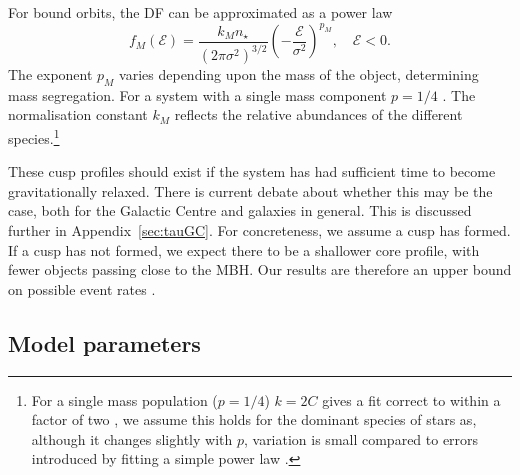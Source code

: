\documentclass[useAMS,usedcolumn,usegraphicx,usenatbib]{mn2e}
\newcommand{\apref}[1]{Appendix~\ref{sec:#1}}
\begin{document}
For bound orbits, the DF can be approximated as a power law \citep{Peebles1972}
\begin{equation}
f_M(\mathcal{E}) = \frac{k_M n_\star}{(2\pi\sigma^2)^{3/2}}\left(-\frac{\mathcal{E}}{\sigma^2}\right)^{p_M},\quad\mathcal{E} < 0.
\label{eq:Bound_DF}
\end{equation}
The exponent $p_M$ varies depending upon the mass of the object, determining mass segregation. For a system with a single mass component $p = 1/4$ \citep{Bahcall1976, Young1977}. The normalisation constant $k_M$ reflects the relative abundances of the different species.\footnote{For a single mass population ($p = 1/4$) $k = 2 C$ gives a fit correct to within a factor of two \citep{Bahcall1976,Keshet2009}, we assume this holds for the dominant species of stars as, although it changes slightly with $p$, variation is small compared to errors introduced by fitting a simple power law \citep{Hopman2006, Alexander2009}.}

These cusp profiles should exist if the system has had sufficient time to become gravitationally relaxed. There is current debate about whether this may be the case, both for the Galactic Centre and galaxies in general. This is discussed further in \apref{tauGC}. For concreteness, we assume a cusp has formed. If a cusp has not formed, we expect there to be a shallower core profile, with fewer objects passing close to the MBH. Our results are therefore an upper bound on possible event rates \citep{Merritt2010a,Antonini2011,Gualandris2012}. 

\subsection{Model parameters}\label{sec:GC-Param}
\end{document}
